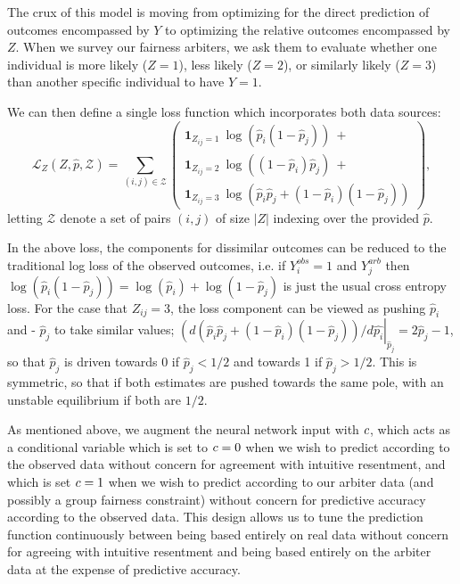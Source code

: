     The crux of this model is moving from optimizing for the direct prediction of outcomes encompassed by $Y$ to optimizing the relative outcomes encompassed by $Z$.  When we survey our fairness arbiters, we ask them to evaluate whether one individual is more likely ($Z = 1$), less likely ($Z = 2$), or similarly likely ($Z = 3$) than another specific individual to have $Y = 1$.
    
    We can then define a single loss function which incorporates both data sources:
    $$ \mathcal{L}_Z(Z, \hat{p}, \mathcal{Z}) = \sum\limits_{(i, j) \in \mathcal{Z}} \left(\begin{array}{l} 
        \mathbf{1}_{Z_{ij} = 1} ~ \log\left( \hat{p}_i (1 - \hat{p}_j)  \right) ~ + \\
        \mathbf{1}_{Z_{ij} = 2} ~ \log\left( (1 - \hat{p}_i) \hat{p}_j  \right) ~ + \\
        \mathbf{1}_{Z_{ij} = 3} ~ \log\left(\hat{p}_i \hat{p}_j + (1 - \hat{p}_i)(1 - \hat{p}_j) \right)
        \end{array}\right), \label{eq:sm_pairwise_loss}$$
    letting $\mathcal{Z}$ denote a set of pairs $(i, j)$ of size $|Z|$ indexing over the provided $\hat{p}$.
    
    In the above loss, the components for dissimilar outcomes can be reduced to the traditional log loss of the observed outcomes, i.e. if $Y_i^{obs} = 1$ and $Y_j^{arb}$ then 
        $ \log\left( \hat{p}_i (1 - \hat{p}_j)  \right) = \log\left( \hat{p}_i \right) + \log\left(1 - \hat{p}_j  \right)$ 
    is just the usual cross entropy loss.  For the case that $Z_{ij} = 3$, the loss component can be viewed as pushing $\hat{p}_i$ and  - $\hat{p}_j$ to take similar values; $\left(d \left(\hat{p}_i \hat{p}_j + (1 - \hat{p}_i)(1 - \hat{p}_j) \right)/d\hat{p_i}\right|_{\hat{p}_j} = 2\hat{p}_j - 1$, so that $\hat{p}_j$ is driven towards 0 if $\hat{p}_j < 1/2$ and towards 1 if $\hat{p}_j > 1/2$.  This is symmetric, so that if both estimates are pushed towards the same pole, with an unstable equilibrium if both are $1/2$.

    As mentioned above, we augment the neural network input with $c$, which acts as a conditional variable which is set to $c = 0$ when we wish to predict according to the observed data without concern for agreement with intuitive resentment, and which is set $c = 1$ when we wish to predict according to our arbiter data (and possibly a group fairness constraint) without concern for predictive accuracy according to the observed data.  This design allows us to tune the prediction function continuously between being based entirely on real data without concern for agreeing with intuitive resentment and being based entirely on the arbiter data at the expense of predictive accuracy.
    
